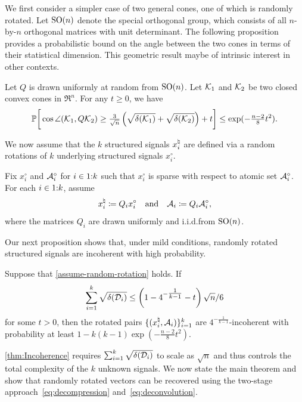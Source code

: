 We first consider a simpler case of two general cones, one of which is randomly rotated. Let $\operatorname{SO}(n)$ denote the special orthogonal group, which consists of all $n$-by-$n$ orthogonal matrices with unit determinant. The following proposition provides a probabilistic bound on the angle between the two cones in terms of their statistical dimension. This geometric result maybe of intrinsic interest in other contexts.

\begin{proposition} \label{prop-angle-cones}
    Let $Q$ is drawn uniformly at random from $\operatorname{SO}(n)$. Let $\mathcal{K}_1$ and $\mathcal{K}_2$ be two closed convex cones in $\Re^n$. For any $t \geq 0$, we have
\[\mathbb{P}\bigg[\cos\angle(\mathcal{K}_1, Q\mathcal{K}_2) \geq  \tfrac{3}{\sqrt{n}}\left(\sqrt{\delta(\mathcal{K}_1)} + \sqrt{\delta(\mathcal{K}_2)}\right) + t\bigg] \leq \exp(-\tfrac{n-2}{8}t^2). \]
\end{proposition}

We now assume that the $k$ structured signals $x_i^{\natural}$ are defined via a random rotations of $k$ underlying structured signals $x_i^\circ$.
\begin{assumption}\label{assume-random-rotation}
   Fix $x_i^\circ$ and $\mathcal{A}_i^\circ$ for $i\in1\mathord{:}k$ such that $x_i^\circ$ is sparse with respect to atomic set $\mathcal{A}_i^\circ$. For each $i\in1\mathord{:}k$, assume 
  \begin{equation*}
    x_i^{\natural} \coloneqq Q_i  x_i^\circ \quad\mbox{and}\quad \mathcal{A}_i \coloneqq  Q_i \mathcal{A}_i^\circ,
  \end{equation*}
  where the matrices $Q_i$ are drawn uniformly and i.i.d.\@ from $\operatorname{SO}(n)$.
\end{assumption}

Our next proposition shows that, under mild conditions, randomly rotated structured signals are incoherent with high probability. 
\begin{proposition} \label{thm:Incoherence}
    Suppose that \autoref{assume-random-rotation} holds. If 
    \[\sum_{i=1}^k \sqrt{\delta(\mathcal{D}_i)} \leq \left(1 - 4^{- \tfrac{1}{k-1} } - t\right)\sqrt{n} / 6\] 
    for some $t>0$, then the rotated pairs $\{(x_i^{\natural},\mathcal{A}_i)\}_{i=1}^k$ are $4^{- \tfrac{1}{k-1} }$-incoherent with probability at least $1 - k(k-1)\exp(-\tfrac{n-2}{8}t^2)$.
\end{proposition}

\autoref{thm:Incoherence} requires $\sum_{i=1}^k \sqrt{\delta(\mathcal{D}_i)}$ to scale as $\sqrt{n}$ and thus controls the total complexity of the $k$ unknown signals. We now state the main theorem and show that randomly rotated vectors can be recovered using the two-stage approach~\eqref{eq:decompression} and~\eqref{eq:deconvolution}.

